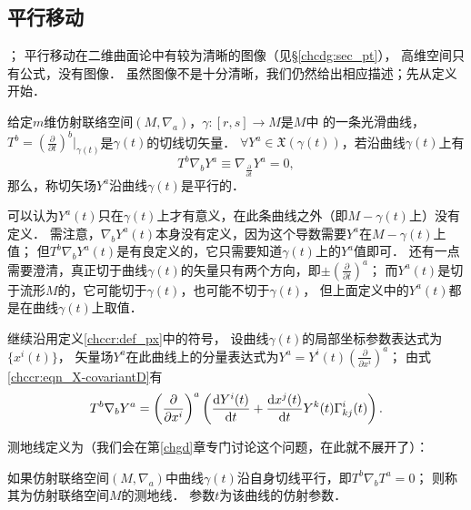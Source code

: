 \subsection{平行移动}\label{chccr:sec_pxyd}

；
平行移动在二维曲面论中有较为清晰的图像（见\S\ref{chcdg:sec_pt}），
高维空间只有公式，没有图像．
虽然图像不是十分清晰，我们仍然给出相应描述；先从定义开始．

\begin{definition}\label{chccr:def_px}
    给定$m$维仿射联络空间$(M,\nabla_a)$，$\gamma:[r,s]\to M$是$M$中
    的一条光滑曲线，$T^b=(\frac{\partial}{\partial t})^b|_{\gamma(t)}$是$\gamma(t)$的切线切矢量．
    $\forall Y^a \in \mathfrak{X}(\gamma(t))$，若沿曲线$\gamma(t)$上有
    \begin{equation}\label{chccr:eqn_px}
        T^b \nabla _b Y^a \equiv \nabla_{\frac{\partial}{\partial t}} Y^a =0 ,
    \end{equation}
    那么，称切矢场$Y^a$沿曲线$\gamma(t)$是{\heiti 平行}的．
\end{definition}

可以认为$Y^a(t)$只在$\gamma(t)$上才有意义，在此条曲线之外（即$M-\gamma(t)$上）没有定义．
需注意，$\nabla _b Y^a(t)$本身没有定义，因为这个导数需要$Y^a$在$M-\gamma(t)$上值；
但$T^b \nabla _b Y^a(t)$是有良定义的，它只需要知道$\gamma(t)$上的$Y^a$值即可．
还有一点需要澄清，真正切于曲线$\gamma(t)$的矢量只有两个方向，即$\pm(\frac{\partial}{\partial t})^a$；
而$Y^a(t)$是切于流形$M$的，它可能切于$\gamma(t)$，也可能不切于$\gamma(t)$，
但上面定义中的$Y^a(t)$都是在曲线$\gamma(t)$上取值．


继续沿用定义\ref{chccr:def_px}中的符号，
设曲线$\gamma(t)$的局部坐标参数表达式为$\{x^i(t)\}$，
矢量场$Y^a$在此曲线上的分量表达式为$Y^a=Y^i(t)(\frac{\partial}{\partial x^i})^a$；
由式\eqref{chccr:eqn_X-covariantD}有
\begin{equation}\label{chccr:eqn_px-formula}
    T^b \nabla _b Y^a = \left(\frac{\partial}{\partial x^i}\right)^a
    \left(\frac{{\rm d} Y^i(t)}{{\rm d}t} +
    \frac{{\rm d}x^j(t)}{{\rm d} t} Y^k(t) \Gamma_{kj}^i(t) \right) .
\end{equation}

测地线定义为（我们会在第\ref{chgd}章专门讨论这个问题，在此就不展开了）：

\begin{definition}\label{chccr:def_geodesic}
如果仿射联络空间$(M,\nabla_a)$中曲线$\gamma(t)$沿自身切线平行，即$T^b \nabla _b T^a=0$；
则称其为仿射联络空间$M$的{\heiti 测地线}．  
参数$t$为该曲线的{\heiti 仿射参数}．
\end{definition}



